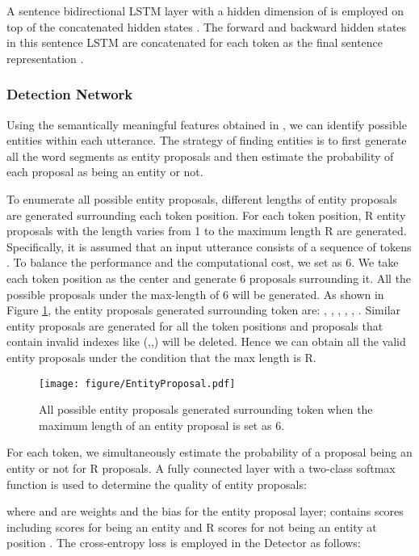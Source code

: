 \documentclass[11pt,a4paper]{article}
\begin{document}
A sentence bidirectional LSTM layer with a hidden dimension of  is employed on top of the concatenated hidden states . The forward and backward hidden states in this sentence LSTM are concatenated for each token as the final sentence representation  .

\subsubsection{Detection Network}
Using the semantically meaningful features obtained in , we can identify possible entities within each utterance. The strategy of finding entities is to first generate all the word segments as entity proposals and then estimate the probability of each proposal as being an entity or not. 

To enumerate all possible entity proposals, different lengths of entity proposals are generated surrounding each token position.
For each token position, R entity proposals with the length varies from 1 to the maximum length R are generated.
Specifically, it is assumed that an input utterance consists of a sequence of  tokens . 
To balance the performance and the computational cost, we set  as 6.
We take each token position as the center and generate 6 proposals surrounding it. All the possible  proposals under the max-length of 6 will be generated.
As shown in Figure \ref{fig:entity_proposal}, the entity proposals generated surrounding token  are: , , , , , . 
Similar entity proposals are generated for all the token positions and proposals that contain invalid indexes like (,,) will be deleted. Hence we can obtain all the valid entity proposals under the condition that the max length is R.

\begin{figure}[htbp!]
    \centering
    \texttt{[image: figure/EntityProposal.pdf]}\vspace{-2mm}
    \caption{All possible entity proposals generated surrounding token  when the maximum length of an entity proposal  is set as 6.}
    \label{fig:entity_proposal}
\end{figure}

For each token, we simultaneously estimate the probability of a proposal being an entity or not for R proposals.
A fully connected layer with a two-class softmax function is used to determine the quality of entity proposals:

where  and  are weights and the bias for the entity proposal layer;  contains  scores including  scores for being an entity and R scores for not being an entity at position . The cross-entropy loss is employed in the Detector as follows:
\end{document}
